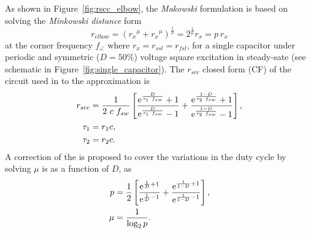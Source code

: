 \begin{SCfigure}[][!h]
\newcommand\pHeigh{3cm}
\newcommand\pWidth{5cm}
\centering

\caption[\emph{Makowski} approximation of the $r_{scc}$]{Graphic demonstration of the \emph{Minkowski distance} $p$ between the two asymptotic limits ($r_{ssl}$ and $r_{fsl}$), and the closed form (CF) of $r_{scc}$. }
\label{fig:rscc_elbow}
\end{SCfigure}
As shown in Figure~\ref{fig:rscc_elbow}, the \emph{Makowski} formulation is based on solving the \emph{Minkowski distance} form
\begin{equation}
r_{elbow} = \left( {r_x}^{\mu}+{r_x}^{\mu} \right) ^\frac{1}{\mu} = 2^\frac{1}{\mu} r_x = p~r_x
\label{eq:r_scc_II}
\end{equation}
at the corner frequency $f_{\angle}$ where $r_x = r_{ssl} = r_{fsl}$, for a single capacitor under periodic and symmetric ($D=50\%$) voltage square excitation in steady-sate (see schematic in Figure~\ref{fig:single_capacitor}). The $r_{scc}$ closed form (CF) of the circuit used in to the approximation is
\begin{align}
r_{scc} & =  \frac{1}{2~c~f_{sw}} \left[ \frac{\mathrm{e}^{\frac{D}{\tau_1~f_{sw}}}+1}{\mathrm{e}^{\frac{D}{\tau_1~f_{sw}}}-1} +
\frac{\mathrm{e}^{\frac{1-D}{\tau_2~f_{sw}}}+1}{\mathrm{e}^{\frac{1-D}{\tau_2~f_{sw}}}-1} \right],\\
\tau_1 &= r_1c,\\
\tau_2 &= r_2c.
\label{eq:r_scc_CF}
\end{align}
A correction of the \citeauthor{2012Makowski} is proposed to cover the variations in the duty cycle by solving $\mu$ is as a function of $D$, as
\begin{align}
p & = \frac{1}{2} \left[ \frac{\mathrm{e}^{\frac{1}{D}+1}}{\mathrm{e}^{\frac{1}{D}-1}} + \frac{\mathrm{e}^{\frac{1}{1-D}+1}}{\mathrm{e}^{\frac{1}{1-D}-1}} \right], \label{eq:p}\\
\mu &= \frac{1}{\log_2 p}.
\label{eq:u_factor}
\end{align}
